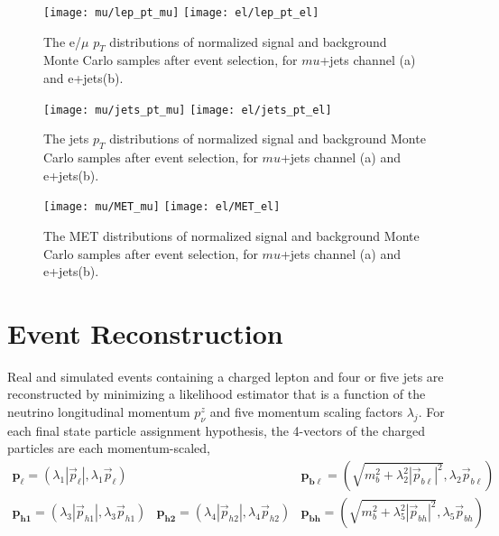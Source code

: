 \documentclass{cmspaperpdf}
\begin{document}
\begin{figure}[htb]
\texttt{[image: mu/lep\_pt\_mu]}
\texttt{[image: el/lep\_pt\_el]}
\centering
\caption{\small \small The e/$\mu$ $p_T$ distributions of normalized signal and background Monte Carlo samples after event selection, for $mu$+jets channel (a) and e+jets(b). }
\label{fig:lep_pt}
\end{figure}

\begin{figure}[htb]
\texttt{[image: mu/jets\_pt\_mu]}
\texttt{[image: el/jets\_pt\_el]}
\centering
\caption{\small \small The jets $p_T$ distributions of normalized signal and background Monte Carlo samples after event selection, for $mu$+jets channel (a) and e+jets(b). }
\label{fig:jets_pt}
\end{figure}

\begin{figure}[htb]
\texttt{[image: mu/MET\_mu]}
\texttt{[image: el/MET\_el]}
\centering
\caption{\small \small The MET distributions of normalized signal and background Monte Carlo samples after event selection, for $mu$+jets channel (a) and e+jets(b). }
\label{fig:met}
\end{figure}


\section{Event Reconstruction}
\label{sec:reconstruction}

Real and simulated events containing a charged lepton and four or five jets are reconstructed by minimizing a likelihood estimator that is a function of the neutrino longitudinal momentum $p_\nu^z$ and five momentum scaling factors $\lambda_j$.  For each final state particle assignment hypothesis, the 4-vectors of the charged particles are each momentum-scaled,
\begin{equation}
\begin{array}{lll}
\boldsymbol{p_\ell} = \left(\lambda_1|\vec p_\ell |, \lambda_1\vec p_\ell\right) & &
\boldsymbol{p_{b\ell}} = \left(\sqrt{m_b^2+\lambda_2^2|\vec p_{b\ell}|^2}, \lambda_2\vec p_{b\ell}\right)  \\
\boldsymbol{p_{h1}} = \left(\lambda_3|\vec p_{h1} |, \lambda_3\vec p_{h1}\right) &
\boldsymbol{p_{h2}} = \left(\lambda_4|\vec p_{h2} |, \lambda_4\vec p_{h2}\right) &
\boldsymbol{p_{bh}} = \left(\sqrt{m_b^2+\lambda_5^2|\vec p_{bh}|^2}, \lambda_5\vec p_{bh}\right)
\end{array}
\end{equation}
\end{document}
